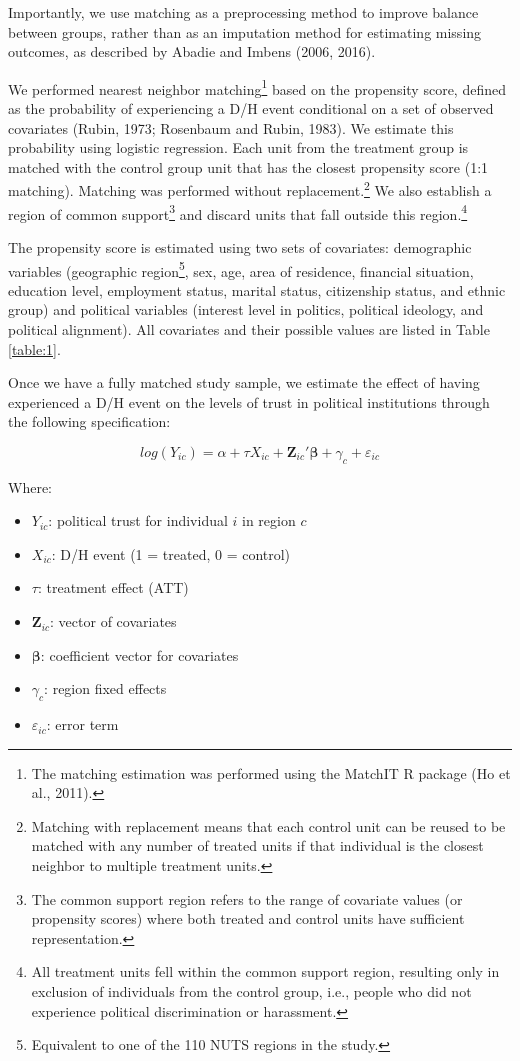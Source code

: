 \documentclass{article}
\begin{document}
Importantly, we use matching as a preprocessing method to improve balance between groups, rather than as an imputation method for estimating missing outcomes, as described by Abadie and Imbens (2006, 2016).

We performed nearest neighbor matching\footnote{The matching estimation was performed using the MatchIT R package (Ho et al., 2011).} based on the propensity score, defined as the probability of experiencing a D/H event conditional on a set of observed covariates (Rubin, 1973; Rosenbaum and Rubin, 1983). We estimate this probability using logistic regression. Each unit from the treatment group is matched with the control group unit that has the closest propensity score (1:1 matching). Matching was performed without replacement.\footnote{Matching with replacement means that each control unit can be reused to be matched with any number of treated units if that individual is the closest neighbor to multiple treatment units.} We also establish a region of common support\footnote{The common support region refers to the range of covariate values (or propensity scores) where both treated and control units have sufficient representation.} and discard units that fall outside this region.\footnote{All treatment units fell within the common support region, resulting only in exclusion of individuals from the control group, i.e., people who did not experience political discrimination or harassment.}

The propensity score is estimated using two sets of covariates: demographic variables (geographic region\footnote{Equivalent to one of the 110 NUTS regions in the study.}, sex, age, area of residence, financial situation, education level, employment status, marital status, citizenship status, and ethnic group) and political variables (interest level in politics, political ideology, and political alignment). All covariates and their possible values are listed in Table \ref{table:1}.

Once we have a fully matched study sample, we estimate the effect of having experienced a D/H event on the levels of trust in political institutions through the following specification:

\begin{equation}
\label{eq:1}
log(Y_{ic}) = \alpha + \tau X_{ic} + \mathbf{Z}_{ic}'\mathbf{\beta} + \gamma_c + \varepsilon_{ic}
\end{equation}

Where:
\begin{itemize}
  \item \( Y_{ic} \): political trust for individual \( i \) in region \( c \)
  \item \( X_{ic} \): D/H event (1 = treated, 0 = control)
  \item \( \tau \): treatment effect (ATT)
  \item \( \mathbf{Z}_{ic} \): vector of covariates
  \item \( \mathbf{\beta} \): coefficient vector for covariates
  \item \( \gamma_c \): region fixed effects
  \item \( \varepsilon_{ic} \): error term
\end{itemize}
\end{document}
